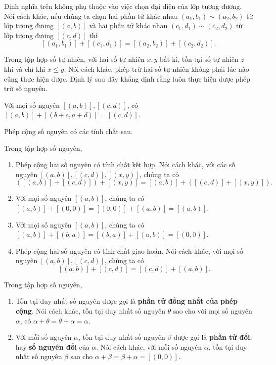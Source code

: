 Định nghĩa trên không phụ thuộc vào việc chọn đại diện của lớp tương đương. Nói cách khác, nếu chúng ta chọn hai phần tử khác nhau $(a_{1}, b_{1}) \sim (a_{2}, b_{2})$ từ lớp tương đương $[(a, b)]$ và  hai phần tử khác nhau $(c_{1}, d_{1}) \sim (c_{2}, d_{2})$ từ lớp tương đương $[(c, d)]$ thì
\[
    [(a_{1}, b_{1})] + [(c_{1}, d_{1})] = [(a_{2}, b_{2})] + [(c_{2}, d_{2})].
\]

Trong tập hợp số tự nhiên, với hai số tự nhiên $x, y$ bất kì, tồn tại số tự nhiên $z$ khi và chỉ khi $x\leq y$. Nói cách khác, phép trừ hai số tự nhiên không phải lúc nào cũng thực hiện được. Định lý sau đây khẳng định rằng luôn thực hiện được phép trừ số nguyên.
\begin{theorem}
    Với mọi số nguyên $[(a, b)], [(c, d)]$, có $[(a, b)] + [(b+c, a+d)] = [(c, d)]$.
\end{theorem}

Phép cộng số nguyên có các tính chất sau.
\begin{theorem}\label{theorem:group-of-integers}
    Trong tập hợp số nguyên,
    \begin{enumerate}[label={(\roman*)}]
        \item Phép cộng hai số nguyên có tính chất kết hợp. Nói cách khác, với các số nguyên $[(a, b)], [(c, d)], [(x, y)]$, chúng ta có
              \[
                  ([(a, b)] + [(c, d)]) + [(x, y)] = [(a, b)] + ([(c, d)] + [(x, y)]).
              \]
        \item Với mọi số nguyên $[(a, b)]$, chúng ta có $[(a, b)] + [(0, 0)] = [(0, 0)] + [(a, b)] = [(a, b)]$.
        \item Với mọi số nguyên $[(a, b)]$, chúng ta có $[(a, b)] + [(b, a)] = [(b, a)] + [(a, b)] = [(0, 0)]$.
        \item Phép cộng hai số nguyên có tính chất giao hoán. Nói cách khác, với mọi số nguyên $[(a, b)], [(c, d)]$, chúng ta có
              \[
                  [(a, b)] + [(c, d)] = [(c, d)] + [(a, b)].
              \]
    \end{enumerate}
\end{theorem}

\begin{theorem}\label{theorem:uniqueness-of-additive-identity-and-additive-inverse}
    Trong tập hợp số nguyên,
    \begin{enumerate}[label={(\roman*)}]
        \item Tồn tại duy nhất số nguyên được gọi là \textbf{phần tử đồng nhất của phép cộng}. Nói cách khác, tồn tại duy nhất số nguyên $\theta$ sao cho với mọi số nguyên $\alpha$, có $\alpha + \theta = \theta + \alpha = \alpha$.
        \item Với mỗi số nguyên $\alpha$, tồn tại duy nhất số nguyên $\beta$ được gọi là \textbf{phần tử đối}, hay \textbf{số nguyên đối} của $\alpha$. Nói cách khác, với mỗi số nguyên $\alpha$, tồn tại duy nhất số nguyên $\beta$ sao cho $\alpha + \beta = \beta + \alpha = [(0,0)]$.
    \end{enumerate}
\end{theorem}

